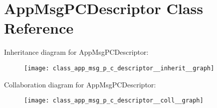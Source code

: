 \hypertarget{class_app_msg_p_c_descriptor}{}\section{App\+Msg\+P\+C\+Descriptor Class Reference}
\label{class_app_msg_p_c_descriptor}


Inheritance diagram for App\+Msg\+P\+C\+Descriptor\+:
\nopagebreak
\begin{figure}[H]
\begin{center}
\leavevmode
\texttt{[image: class\_app\_msg\_p\_c\_descriptor\_\_inherit\_\_graph]}
\end{center}
\end{figure}


Collaboration diagram for App\+Msg\+P\+C\+Descriptor\+:
\nopagebreak
\begin{figure}[H]
\begin{center}
\leavevmode
\texttt{[image: class\_app\_msg\_p\_c\_descriptor\_\_coll\_\_graph]}
\end{center}
\end{figure}
